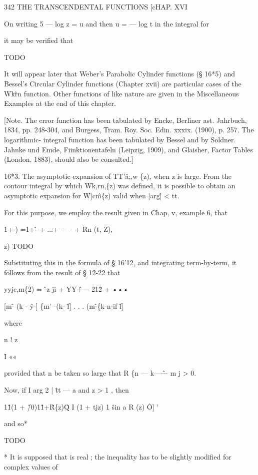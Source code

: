 342 THE TRANSCENDENTAL FUNCTIONS [cHAP. XVI 

On writing 5 — log z = u and then u = — log t in the integral for 

it may be verified that 

TODO

It will appear later that Weber's Parabolic Cylinder functions (§ 16*5) and 
Bessel's Circular Cylinder functions (Chapter xvii) are particular cases of the 
Wk\^rn function. Other functions of like nature are given in the Miscellaneous 
Examples at the end of this chapter. 

[Note. The error function has been tabulated by Encke, Berliner ast. Jahrbuch, 1834, 
pp. 248-304, and Burgess, Tram. Roy. Soc. Edin. xxxix. (1900), p. 257. The logarithmic- 
integral function has been tabulated by Bessel and by Soldner. Jahnke und Emde, 
Fiinktionentafeln (Leipzig, 1909), and Glaisher, Factor Tables (London, 1883), should also 
be consulted.] 

16*3. The asymptotic expansion of TT'\^a;,w \{z), when z is large. 
From the contour integral by which Wk,rn,\{z) was defined, it is possible 
to obtain an asymptotic expansion for W]c\^m\{z) valid when |arg\^| < tt. 

For this purpose, we employ the result given in Chap, v, example 6, that 

1+-) =1+\^- + ...+  — - + Rn (t, Z), 

z)  TODO

Substituting this in the formula of § 16'12, and integrating term-by-term, 
it follows from the result of § 12-22 that 

yyjc,m\{2) = \^ -z ji + YY\^ +— 21\^2 + ••• 

[m\^ - (k - \^y-] \{m' -(k- \^f] . . . (m\^ -\{k-n-if \^f] 



where 



n ! z 



I «« 



provided that n be taken so large that R \{n — k—-\^-- m j > 0. 

Now, if I arg 2 | \^ tt — a and z > 1 , then 

1\^1(1 + \^/0)1\^1+\^ R\{z)\^Q 
I (1 + tjz) 1 \^ sin a R (z) \^ O] ' 

and so* 

TODO

* It is supposed that  is real ; the inequality has to be slightly modified for complex values of 


